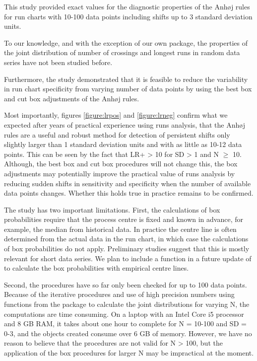 This study provided exact values for the diagnostic properties of the
Anhøj rules for run charts with 10-100 data points including shifts up
to 3 standard deviation units.

To our knowledge, and with the exception of our own 
package, the properties of the joint distribution of number of crossings
and longest runs in random data series have not been studied before.

Furthermore, the study demonstrated that it is feasible to reduce the
variability in run chart specificity from varying number of data points
by using the best box and cut box adjustments of the Anhøj rules.

Most importantly, figures \ref{figure:lrpos} and \ref{figure:lrneg}
confirm what we expected after years of practical experience using runs
analysis, that the Anhøj rules are a useful and robust method for
detection of persistent shifts only slightly larger than 1 standard
deviation units and with as little as 10-12 data points. This can be
seen by the fact that LR+ \textgreater{} 10 for SD \textgreater{} 1 and
N \(\geq\) 10. Although, the best box and cut box procedures will not
change this, the box adjustments may potentially improve the practical
value of runs analysis by reducing sudden shifts in sensitivity and
specificity when the number of available data points changes. Whether
this holds true in practice remains to be confirmed.

The study has two important limitations. First, the calculations of box
probabilities require that the process centre is fixed and known in
advance, for example, the median from historical data. In practice the
centre line is often determined from the actual data in the run chart,
in which case the calculations of box probabilities do not apply.
Preliminary studies suggest that this is mostly relevant for short data
series. We plan to include a function in a future update of
 to calculate the box probabilities with empirical
centre lines.

Second, the procedures have so far only been checked for up to 100 data
points. Because of the iterative procedures and use of high precision
numbers using functions from the  package \citep{rmpfr}
to calculate the joint distributions for varying N, the computations are
time consuming. On a laptop with an Intel Core i5 processor and 8 GB
RAM, it takes about one hour to complete  for N =
10-100 and SD = 0-3, and the objects created consume over 6 GB of
memory. However, we have no reason to believe that the procedures are
not valid for N \textgreater{} 100, but the application of the box
procedures for larger N may be impractical at the moment.

